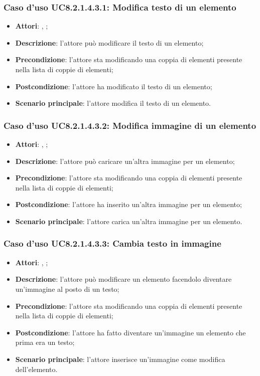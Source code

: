 		\subsubsection{Caso d'uso UC8.2.1.4.3.1: Modifica testo di un elemento}
		\label{UC8.2.1.4.3.1}
		\begin{itemize}
			\item \textbf{Attori}: \uau, \uaupro;
			\item \textbf{Descrizione}: l'attore può modificare il testo di un elemento;
			\item \textbf{Precondizione}: l'attore sta modificando una coppia di elementi presente nella lista di coppie di elementi; 
			\item \textbf{Postcondizione}: l'attore ha modificato il testo di un elemento;
			\item \textbf{Scenario principale}: l'attore modifica il testo di un elemento.  
		\end{itemize}
		
		\subsubsection{Caso d'uso UC8.2.1.4.3.2: Modifica immagine di un elemento}
		\label{UC8.2.1.4.3.2}
		\begin{itemize}
			\item \textbf{Attori}: \uau, \uaupro;
			\item \textbf{Descrizione}: l'attore può caricare un'altra immagine per un elemento;
			\item \textbf{Precondizione}: l'attore sta modificando una coppia di elementi presente nella lista di coppie di elementi; 
			\item \textbf{Postcondizione}: l'attore ha inserito un'altra immagine per un elemento;
			\item \textbf{Scenario principale}: l'attore carica un'altra immagine per un elemento.
		\end{itemize}
		
		\subsubsection{Caso d'uso UC8.2.1.4.3.3: Cambia testo in immagine}
		\label{UC8.2.1.4.3.3}
		\begin{itemize}
			\item \textbf{Attori}: \uau, \uaupro;
			\item \textbf{Descrizione}: l'attore può modificare un elemento facendolo diventare un'immagine al posto di un testo;
			\item \textbf{Precondizione}: l'attore sta modificando una coppia di elementi presente nella lista di coppie di elementi; 
			\item \textbf{Postcondizione}: l'attore ha fatto diventare un'immagine un elemento che prima era un testo;
			\item \textbf{Scenario principale}: l'attore inserisce un'immagine come modifica dell'elemento.  
		\end{itemize}
		
